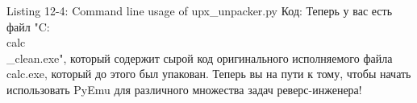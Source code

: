 \documentclass[12pt]{book}
\begin{document}
Listing 12-4: Command line usage of upx\_unpacker.py
Код:
Теперь у вас есть файл "C:\\calc\\\_clean.exe", который содержит сырой код оригинального исполняемого файла calc.exe, который до этого был упакован. Теперь вы на пути к тому, чтобы начать использовать PyEmu для различного множества задач реверс-инженера!
\end{document}
